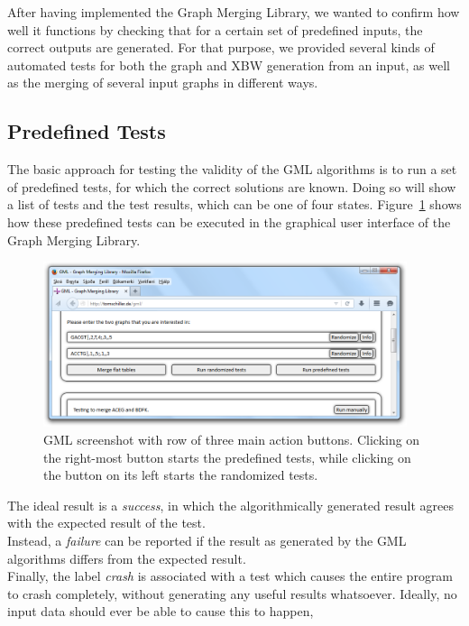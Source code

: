 \documentclass[a4paper,12pt,twoside,BCOR=10mm]{scrbook}
\begin{document}
After having implemented the Graph Merging Library, 
we wanted to confirm how well it functions by checking 
that for a certain set of predefined inputs, the correct outputs are generated. 
For that purpose, we provided several kinds of automated tests for both the 
graph and XBW generation from an input, as well as the merging of several input graphs 
in different ways.

\subsection{Predefined Tests}

The basic approach for testing the validity of the GML algorithms is to run a set 
of predefined tests, for which the correct solutions are known. Doing so will 
show a list of tests and the test results, which can be one of four states. 
Figure~\ref{fig:evo_gml_test_buttons} shows how these predefined tests can be executed in the graphical user interface 
of the Graph Merging Library. \\
\begin{figure}[!htb]
\centering
\includegraphics[width=0.95\textwidth]{evo_gml_test_buttons.png}
\caption[GML Test Execution]{GML screenshot with row of three main action buttons. Clicking on the right-most button starts the predefined tests, while clicking on the button on its left starts the randomized tests.} \label{fig:evo_gml_test_buttons}
\end{figure}
The ideal result is a \textit{success}, in which the algorithmically generated result agrees with the 
expected result of the test. \\
Instead, a \textit{failure} can be reported if the result as generated by the GML algorithms 
differs from the expected result. \\
Finally, the label \textit{crash} is associated with a test which causes the 
entire program to crash completely, without generating any useful results whatsoever. 
Ideally, no input data should ever be able to cause this to happen, 
\end{document}
